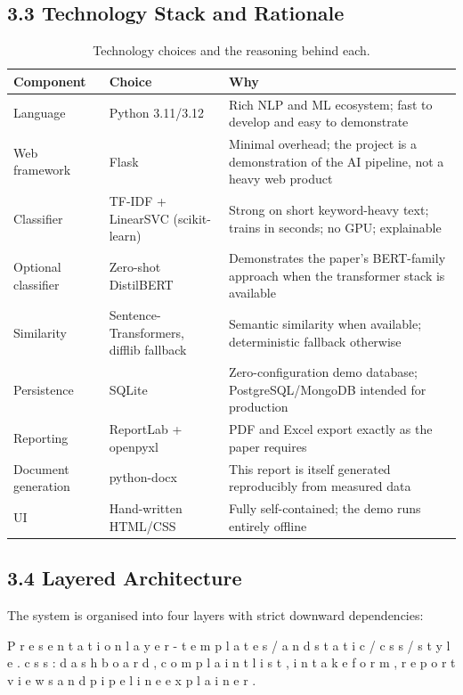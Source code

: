 \documentclass[10pt,letterpaper,oneside]{article}\usepackage{geometry}\geometry{top=1in,bottom=1in,left=1in,right=1in,includeheadfoot}\usepackage{xcolor}\definecolor{color@navy}{HTML}{1F3B63}\definecolor{color@grey}{HTML}{404040}\definecolor{color@hdr}{HTML}{F2F4F7}\usepackage{titlesec}\titleformat{\section}  {\normalfont\huge\bfseries\color@navy}  {}{0pt}{\MakeUppercase}\titleformat{\subsection}  {\normalfont\Large\bfseries\color@navy}  {}{0pt}{}\titleformat{\subsubsection}  {\normalfont\large\bfseries\color@navy}  {}{0pt}{}\titlespacing*{\section}{0pt}{14pt}{6pt}\titlespacing*{\subsection}{0pt}{10pt}{4pt}\titlespacing*{\subsubsection}{0pt}{8pt}{3pt}\setlength{\parindent}{0pt}\setlength{\parskip}{0.6em}\parindent=0pt\usepackage{enumitem}\setlist{nosep,leftmargin=*,itemsep=0pt,topsep=2pt,partopsep=0pt}\usepackage{array}\usepackage{booktabs}\usepackage{caption}\captionsetup{font={small,it},labelfont={bf},labelsep=period,  parskip=2pt,skip=4pt,list=no}\captionsetup[table]{labelfont={bf,small,color@navy},name=Table}\usepackage{graphicx}\usepackage{verbatim}\usepackage{ragged2e}\usepackage{longtable}\usepackage{tabularx}\usepackage{multirow}\usepackage{colortbl}\definecolor{rowshade}{HTML}{F2F4F7}\usepackage{tikz}\usetikzlibrary{positioning,calc}\usepackage[hidelinks]{hyperref}\hypersetup{colorlinks=true,linkcolor=color@navy,urlcolor=color@navy}\pagestyle{fancy}\fancyhf{}\renewcommand{\headrulewidth}{0.4pt}\fancyhead[L]{\small\color@navy CivicSense — Project Report}\fancyhead[R]{\small\color@grey October 11, 2026}\fancyfoot[C]{\small\color@grey An Integrated Intelligent Triage Pipelin}\fancyfoot[R]{\small\color@grey Page \thepage}\usepackage{setspace}\setstretch{1.15}\AtBeginDocument{  \hypersetup{pdftitle={An Integrated Intelligent Triage Pipeline for AI-Enhanced Citizen Complaint Management},    pdfauthor={CivicSense Project Team},    pdfsubject={Project Report},    pdfkeywords={smart cities, NLP, complaint management, e-governance},    pdfcreator={CivicSense Project Team}  }}
\begin{document}
\subsection*{3.3 Technology Stack and Rationale}
\begin{table}[htbp]
\centering
\small
\begin{tabular}{@{}lll@{}}
\toprule
Component & Choice & Why \\
\midrule
Language & Python 3.11/3.12 & Rich NLP and ML ecosystem; fast to develop and easy to demonstrate \\
Web framework & Flask & Minimal overhead; the project is a demonstration of the AI pipeline, not a heavy web product \\
Classifier & TF-IDF + LinearSVC (scikit-learn) & Strong on short keyword-heavy text; trains in seconds; no GPU; explainable \\
Optional classifier & Zero-shot DistilBERT & Demonstrates the paper’s BERT-family approach when the transformer stack is available \\
Similarity & Sentence-Transformers, difflib fallback & Semantic similarity when available; deterministic fallback otherwise \\
Persistence & SQLite & Zero-configuration demo database; PostgreSQL/MongoDB intended for production \\
Reporting & ReportLab + openpyxl & PDF and Excel export exactly as the paper requires \\
Document generation & python-docx & This report is itself generated reproducibly from measured data \\
UI & Hand-written HTML/CSS & Fully self-contained; the demo runs entirely offline \\
\bottomrule
\end{tabular}
\caption{Technology choices and the reasoning behind each.}
\end{table}

\subsection*{3.4 Layered Architecture}
The system is organised into four layers with strict downward dependencies:

\item P r e s e n t a t i o n   l a y e r   -   t e m p l a t e s /   a n d   s t a t i c / c s s / s t y l e . c s s :   d a s h b o a r d ,   c o m p l a i n t   l i s t ,   i n t a k e   f o r m ,   r e p o r t   v i e w s   a n d   p i p e l i n e   e x p l a i n e r .
\end{document}
